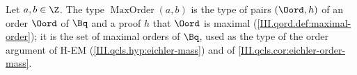 Let $a,b\in\Z$. The type $\operatorname{MaxOrder}(a,b)$ is the type of pairs $(\Oord,h)$ of an order $\Oord$ of $\Bq$ and a proof $h$ that $\Oord$ is maximal
(\cref{III.qord.def:maximal-order}); it is the set of maximal orders of $\Bq$, used as the type of the order argument of H-EM
(\cref{III.qcls.hyp:eichler-mass}) and of \cref{III.qcls.cor:eichler-order-mass}.
